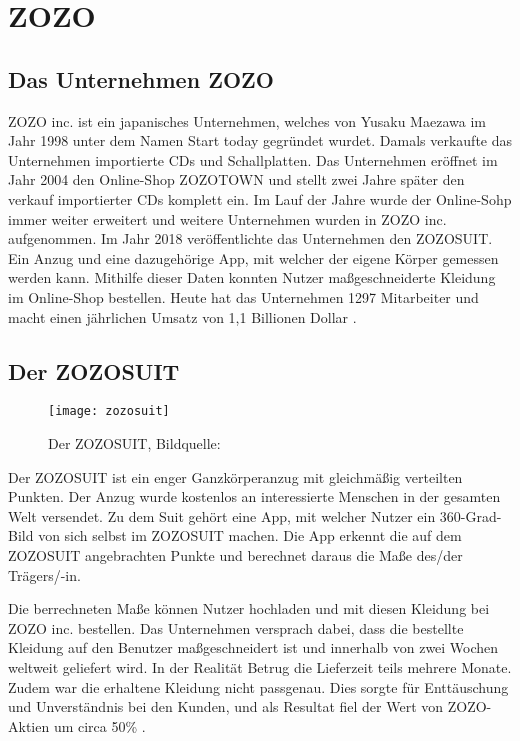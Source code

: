 \chapter{ZOZO}
\label{ch:zozosuit}

\section{Das Unternehmen ZOZO}
\label{sec:zozo}
ZOZO inc. ist ein japanisches Unternehmen, welches von Yusaku Maezawa im Jahr 1998 unter dem 
Namen \glqq{}Start today\grqq{} gegründet wurdet. Damals verkaufte das Unternehmen importierte 
CDs und Schallplatten. \newline
Das Unternehmen eröffnet im Jahr 2004 den Online-Shop ZOZOTOWN und stellt zwei Jahre später 
den verkauf importierter CDs komplett ein. \newline
Im Lauf der Jahre wurde der Online-Sohp immer weiter erweitert und weitere Unternehmen wurden in 
ZOZO inc. aufgenommen. \newline
Im Jahr 2018 veröffentlichte das Unternehmen den ZOZOSUIT. Ein Anzug und eine dazugehörige App, 
mit welcher der eigene Körper gemessen werden kann. Mithilfe dieser Daten konnten Nutzer 
maßgeschneiderte Kleidung im Online-Shop bestellen. \newline
Heute hat das Unternehmen 1297 Mitarbeiter und macht einen jährlichen Umsatz von 
1,1 Billionen Dollar \cite{misc:zozoforbes}.\cite{misc:zozohistory}

\pagebreak
\section{Der ZOZOSUIT}
\label{sec:zozosuit}

\begin{figure}[htpb]
    \centering
    \texttt{[image: zozosuit]}
    \caption{Der ZOZOSUIT, Bildquelle: \cite{misc:zozopic}}
    \label{img:zozosuit}
\end{figure}
Der ZOZOSUIT ist ein enger Ganzkörperanzug mit gleichmäßig verteilten Punkten. Der Anzug wurde 
kostenlos an interessierte Menschen in der gesamten Welt versendet. \newline
Zu dem Suit gehört eine App, mit welcher Nutzer ein 360-Grad-Bild von sich selbst im ZOZOSUIT machen. 
Die App erkennt die auf dem ZOZOSUIT angebrachten Punkte und berechnet daraus die Maße 
des/der Trägers/-in.

Die berrechneten Maße können Nutzer hochladen und mit diesen Kleidung bei 
ZOZO inc. bestellen. Das Unternehmen versprach dabei, dass die bestellte Kleidung auf den Benutzer 
maßgeschneidert ist und innerhalb von zwei Wochen weltweit geliefert wird. \newline
In der Realität Betrug die Lieferzeit teils mehrere Monate. Zudem war die erhaltene Kleidung nicht passgenau. \newline
Dies sorgte für Enttäuschung und Unverständnis bei den Kunden, und als Resultat fiel der Wert von ZOZO-Aktien um circa 
50\% \cite{misc:zozoaktie}. \cite{misc:zozobad}

